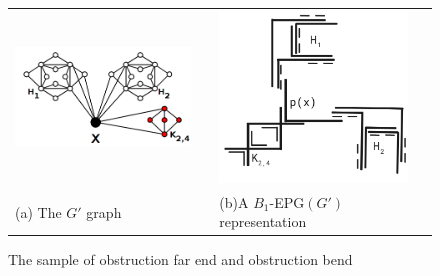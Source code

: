 \begin{figure}[h]
  \centering
  \begin{tabular}{p{5cm} p{1cm} p{5cm}}
     \includegraphics[width=5cm, center]{./img/grafoDobraExtremidadeObstruida.png} & &\includegraphics[width=5cm, center]{./img/extremidadeDobraObstruida.png}  \\%
    \footnotesize \centering (a) The $G'$ graph& & \footnotesize \centering (b)A $B_1$-EPG$(G')$ representation%
  \end{tabular}
 \caption{The sample of obstruction far end and obstruction bend}\label{fig:extremidadeDobraObstruida}
\end{figure}